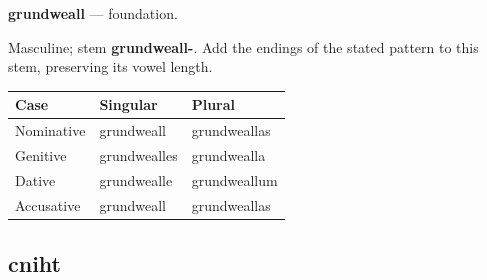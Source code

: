 \par\begin{minipage}{\linewidth}\raggedright
\textbf{grundweall} — foundation.

Masculine; stem \textbf{grundweall-}. Add the endings of the stated pattern to this stem, preserving its vowel length.

\par\begingroup
\fontsize{10.5}{13.2}\selectfont
\setlength{\LTleft}{0pt}\setlength{\LTright}{\fill}
\noindent
\begin{tabular}{@{}>{\raggedright\arraybackslash}p{34.82mm}>{\raggedright\arraybackslash}p{41.78mm}>{\raggedright\arraybackslash}p{41.78mm}@{}}
\toprule
\textbf{Case} & \textbf{Singular} & \textbf{Plural} \\
\midrule
Nominative & grundweall & grundweallas \\
Genitive & grundwealles & grundwealla \\
Dative & grundwealle & grundweallum \\
Accusative & grundweall & grundweallas \\
\bottomrule
\end{tabular}
\par\endgroup

\end{minipage}\par
{}
\subsection*{cniht}

